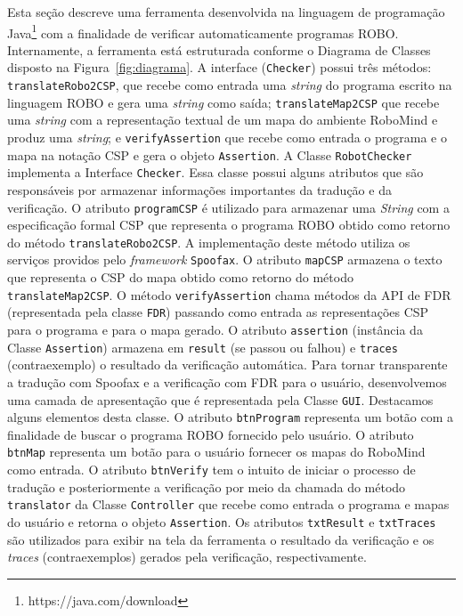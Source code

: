 Esta seção descreve uma ferramenta desenvolvida na linguagem de programação Java\footnote[8]{https://java.com/download} com a finalidade de verificar automaticamente programas ROBO. Internamente, a ferramenta está estruturada conforme o Diagrama de Classes disposto na Figura~\ref{fig:diagrama}. A interface (\texttt{Checker}) possui três métodos: \texttt{translateRobo2CSP}, que recebe como entrada uma \textit{string} do programa escrito na linguagem ROBO e gera uma \textit{string} como saída; \texttt{translateMap2CSP} que recebe uma \textit{string} com a representação textual de um mapa do ambiente RoboMind e produz uma \textit{string}; e \texttt{verifyAssertion} que recebe como entrada o programa e o mapa na notação CSP e gera o objeto \texttt{Assertion}. A Classe \texttt{RobotChecker} implementa a Interface \texttt{Checker}. Essa classe possui alguns atributos que são responsáveis por armazenar informações importantes da tradução e da verificação. O atributo \texttt{programCSP} é utilizado para armazenar uma \textit{String} com a especificação formal CSP que representa o programa ROBO obtido como retorno do método \texttt{translateRobo2CSP}. A implementação deste método utiliza os serviços providos pelo \textit{framework} \texttt{Spoofax}. O atributo \texttt{mapCSP} armazena o texto que representa o CSP do mapa obtido como retorno do método \texttt{translateMap2CSP}. O método \texttt{verifyAssertion} chama métodos da API de FDR (representada pela classe \texttt{FDR}) passando como entrada as representações CSP para o programa e para o mapa gerado. O atributo \texttt{assertion} (instância da Classe \texttt{Assertion}) armazena em  \texttt{result} (se passou ou falhou) e \texttt{traces} (contraexemplo) o resultado da verificação automática. Para tornar transparente a tradução com Spoofax e a verificação com FDR para o usuário, desenvolvemos uma camada de apresentação que é representada pela Classe \texttt{GUI}. Destacamos alguns elementos desta classe. O atributo \texttt{btnProgram} representa um botão com a finalidade de buscar o programa ROBO fornecido pelo usuário. O atributo \texttt{btnMap} representa um botão para o usuário fornecer os mapas do RoboMind como entrada. O atributo \texttt{btnVerify} tem o intuito de iniciar o processo de tradução e posteriormente a verificação por meio da chamada do método \texttt{translator} da Classe \texttt{Controller} que recebe como entrada o programa e mapas do usuário e retorna o objeto \texttt{Assertion}. Os atributos \texttt{txtResult} e \texttt{txtTraces} são utilizados para exibir na tela da ferramenta o resultado da verificação e os \textit{traces} (contraexemplos) gerados pela verificação, respectivamente.

